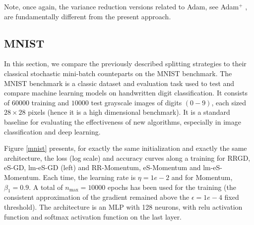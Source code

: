 \documentclass[article,authoryear,jmlmc]{beg_32}             %
\begin{document}
        Note, once again, the variance reduction versions related to Adam, see Adam$^+$ \cite{adam_variance1}, are fundamentally different from the present approach.

\subsection{MNIST}
\label{s_mnist}

In this section, we compare the previously described splitting strategies to their classical stochastic mini-batch counteparts on the MNIST benchmark. 
The MNIST benchmark is a classic dataset and evaluation task used to test and compare machine learning models on handwritten digit classification. 
It consists of $60000$ training and $10000$ test grayscale images of digits $(0-9)$, each sized $28\times 28$ pixels (hence it is a high dimensional benchmark). 
It is a standard baseline for evaluating the effectiveness of new algorithms, especially in image classification and deep learning.

Figure \ref{mnist} presents, for exactly the same initialization and exactly the same architecture, the loss (log scale) and accuracy curves along a training for RRGD, eS-GD, lm-eS-GD (left) and RR-Momentum,
eS-Momentum and lm-eS-Momentum. Each time, the learning rate is $\eta = 1e-2$ and for Momentum, $\beta_1 = 0.9$. 
A total of $n_\max=10000$ epochs has been used for the training (the consistent approximation of the gradient remained above the $\epsilon = 1e-4$ fixed threshold). 
The architecture is an MLP with 128 neurons, with relu activation function and softmax activation function on the last layer.  

\end{document}
